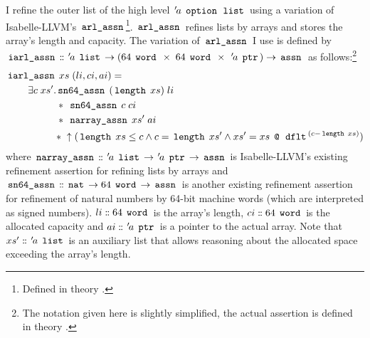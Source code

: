 I refine the outer list of the high level ${\mskip2mu '\mskip-2mua} \; \,\text{\ttfamily option}\, \; \,\text{\ttfamily list}\,$ using a variation of Isabelle-LLVM's $\,\text{\ttfamily arl\_assn}\,$\footnote{Defined in theory .}.
$\,\text{\ttfamily arl\_assn}\,$ refines lists by arrays and stores the array's length and capacity.
The variation of $\,\text{\ttfamily arl\_assn}\,$ I use is defined by $\,\text{\ttfamily iarl\_assn}\, \mathrel{\mathord{:}\mkern-1.2mu\mathord{:}} {\mskip2mu '\mskip-2mua} \; \,\text{\ttfamily list}\, \rightarrow (64 \; \,\text{\ttfamily word}\, \; \times \; 64 \; \,\text{\ttfamily word}\, \; \times \; {\mskip2mu '\mskip-2mua} \; \,\text{\ttfamily ptr}\,) \rightarrow \,\text{\ttfamily assn}\,$ as follows:\footnote{The notation given here is slightly simplified, the actual assertion is defined in theory .}
\begin{align*}
	\,\text{\ttfamily iarl\_assn}\,   & \; xs \; (li,ci,ai) =                                                                                                                                     \\
	\exists c \; xs'. & \,\text{\ttfamily sn64\_assn}\, \; (\,\text{\ttfamily length}\, \; xs) \; li                                                                                                        \\
	                    & \ast \; \,\text{\ttfamily sn64\_assn}\, \; c \; ci                                                                                                                    \\
	                    & \ast \; \,\text{\ttfamily narray\_assn}\, \; xs' \; ai                                                                                                                \\
	                    & \ast \; \uparrow(\,\text{\ttfamily length}\, \; xs \leq c \land c = \,\text{\ttfamily length}\, \; xs' \land xs' = xs \; \,\text{\ttfamily @}\, \; \,\text{\ttfamily dflt}\,^{(c - \,\text{\ttfamily length}\, \; xs)})
\end{align*}
where $\,\text{\ttfamily narray\_assn}\, \mathrel{\mathord{:}\mkern-1.2mu\mathord{:}} {\mskip2mu '\mskip-2mua} \; \,\text{\ttfamily list}\, \rightarrow {\mskip2mu '\mskip-2mua} \; \,\text{\ttfamily ptr}\, \rightarrow \,\text{\ttfamily assn}\,$ is Isabelle-LLVM's existing refinement assertion for refining lists by arrays and $\,\text{\ttfamily sn64\_assn}\, \mathrel{\mathord{:}\mkern-1.2mu\mathord{:}} \,\text{\ttfamily nat}\, \rightarrow 64 \; \,\text{\ttfamily word}\, \rightarrow \,\text{\ttfamily assn}\,$ is another existing refinement assertion for refinement of natural numbers by 64-bit machine words (which are interpreted as signed numbers).
$li \mathrel{\mathord{:}\mkern-1.2mu\mathord{:}} 64 \; \,\text{\ttfamily word}\,$ is the array's length, $ci \mathrel{\mathord{:}\mkern-1.2mu\mathord{:}} 64 \; \,\text{\ttfamily word}\,$ is the allocated capacity and $ai \mathrel{\mathord{:}\mkern-1.2mu\mathord{:}} {\mskip2mu '\mskip-2mua} \; \,\text{\ttfamily ptr}\,$ is a pointer to the actual array.
Note that $xs' \mathrel{\mathord{:}\mkern-1.2mu\mathord{:}} {\mskip2mu '\mskip-2mua} \; \,\text{\ttfamily list}\,$ is an auxiliary list that allows reasoning about the allocated space exceeding the array's length.

